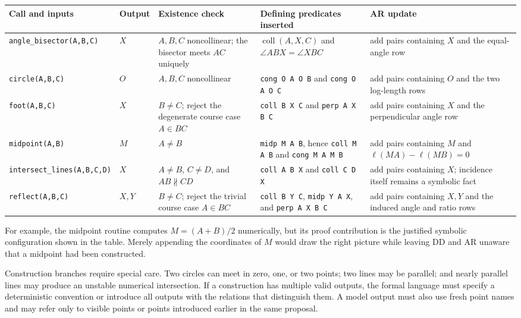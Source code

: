 \documentclass[reqno]{amsart}
\DeclareMathOperator{\1}{\textbf{1}}
\begin{document}
\begin{center}
\small
\setlength{\tabcolsep}{3pt}
\begin{tabular}{p{}p{}p{}p{}p{}}
\textbf{Call and inputs} & \textbf{Output} & \textbf{Existence check} &
\textbf{Defining predicates inserted} & \textbf{AR update} \\
\hline
\texttt{angle\_bisector}\newline\texttt{(A,B,C)} & $X$ & $A,B,C$ noncollinear; the bisector meets $AC$ uniquely &
$\operatorname{coll}(A,X,C)$ and $\angle ABX=\angle XBC$ &
add pairs containing $X$ and the equal-angle row \\
\verb|circle(A,B,C)| & $O$ & $A,B,C$ noncollinear &
\verb|cong O A O B| and \verb|cong O A O C| &
add pairs containing $O$ and the two log-length rows \\
\verb|foot(A,B,C)| & $X$ & $B\ne C$; reject the degenerate course case $A\in BC$ &
\verb|coll B X C| and \verb|perp A X B C| &
add pairs containing $X$ and the perpendicular angle row \\
\verb|midpoint(A,B)| & $M$ & $A\ne B$ &
\verb|midp M A B|, hence \verb|coll M A B| and \verb|cong M A M B| &
add pairs containing $M$ and $\ell(MA)-\ell(MB)=0$ \\
\texttt{intersect\_lines}\newline\texttt{(A,B,C,D)} & $X$ & $A\ne B$, $C\ne D$, and $AB\not\parallel CD$ &
\verb|coll A B X| and \verb|coll C D X| &
add pairs containing $X$; incidence itself remains a symbolic fact \\
\verb|reflect(A,B,C)| & $X,Y$ & $B\ne C$; reject the trivial course case $A\in BC$ &
\verb|coll B Y C|, \verb|midp Y A X|, and \verb|perp A X B C| &
add pairs containing $X,Y$ and the induced angle and ratio rows \\
\end{tabular}
\end{center}

For example, the midpoint routine computes $M=(A+B)/2$ numerically, but its
proof contribution is the justified symbolic configuration shown in the
table. Merely appending the coordinates of $M$ would draw the right picture
while leaving DD and AR unaware that a midpoint had been constructed.

Construction branches require special care. Two circles can meet in zero,
one, or two points; two lines may be parallel; and nearly parallel lines may
produce an unstable numerical intersection. If a construction has multiple
valid outputs, the formal language must specify a deterministic convention or
introduce all outputs with the relations that distinguish them. A model output
must also use fresh point names and may refer only to visible points or points
introduced earlier in the same proposal.
\end{document}
